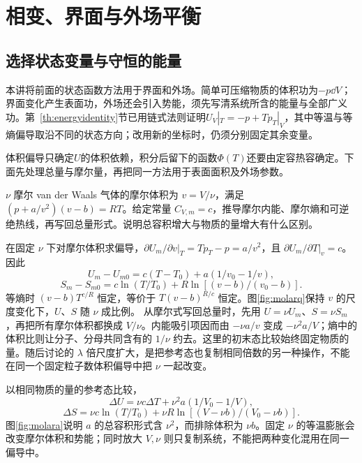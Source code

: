 \chapter{相变、界面与外场平衡}

\section{选择状态变量与守恒的能量}
\label{th:coordinates}
本讲将前面的状态函数方法用于界面和外场。简单可压缩物质的体积功为$-p\dd V$；界面变化产生表面功，外场还会引入势能，须先写清系统所含的能量与全部广义功。第~\ref{th:energyidentity}节已用链式法则证明$U_V|_T=-p+Tp_T|_V$，其中等温与等熵偏导取沿不同的状态方向；改用新的坐标时，仍须分别固定其余变量。

体积偏导只确定$U$的体积依赖，积分后留下的函数$\Phi(T)$还要由定容热容确定。下面先处理总量与摩尔量，再把同一方法用于表面面积及外场参数。


\begin{example}\label{ex:vdwmolar}
$\nu$ 摩尔 van der Waals 气体的摩尔体积为 $v=V/\nu$，满足 $(p+a/v^2)(v-b)=RT$。给定常量 $C_{V,m}=c$，推导摩尔内能、摩尔熵和可逆绝热线，再写回总量形式。说明总容积增大与物质的量增大有什么区别。
\end{example}
\begin{solution}
在固定 $\nu$ 下对摩尔体积求偏导，$\partial U_m/\partial v|_T=Tp_T-p=a/v^2$，且 $\partial U_m/\partial T|_v=c$。因此
\[
 U_m-U_{m0}=c(T-T_0)+a(1/v_0-1/v),
\]
\[
 S_m-S_{m0}=c\ln(T/T_0)+R\ln[(v-b)/(v_0-b)].
\]
等熵时 $(v-b)T^{c/R}$ 恒定，等价于 $T(v-b)^{R/c}$ 恒定。图\ref{fig:molarq}保持 $v$ 的尺度变化下，$U$、$S$ 随 $\nu$ 成比例。
从摩尔式写回总量时，先用 $U=\nu U_m$、$S=\nu S_m$，再把所有摩尔体积都换成 $V/\nu$。内能吸引项因而由 $-\nu a/v$ 变成 $-\nu^2a/V$；熵中的体积比则让分子、分母共同含有的 $1/\nu$ 约去。这里的初末态比较始终固定物质的量。随后讨论的 $\lambda$ 倍尺度扩大，是把参考态也复制相同倍数的另一种操作，不能在同一个固定粒子数体积偏导中把 $\nu$ 一起改变。

以相同物质的量的参考态比较，
\[
 \Delta U=\nu c\Delta T+\nu^2a(1/V_0-1/V),
\]
\[
 \Delta S=\nu c\ln(T/T_0)+\nu R\ln[(V-\nu b)/(V_0-\nu b)].
\]
图\ref{fig:molara}说明 $a$ 的总容积形式含 $\nu^2$，而排除体积为 $\nu b$。固定 $\nu$ 的等温膨胀会改变摩尔体积和势能；同时放大 $V,\nu$ 则只复制系统，不能把两种变化混用在同一偏导中。
\end{solution}

